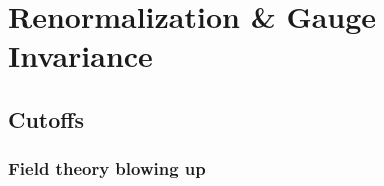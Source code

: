 \documentclass{book}
\theoremstyle{definition}
\begin{document}
\newpage



















\section{Renormalization \& Gauge Invariance}




\subsection{Cutoffs}







\subsubsection{Field theory blowing up}
\end{document}
